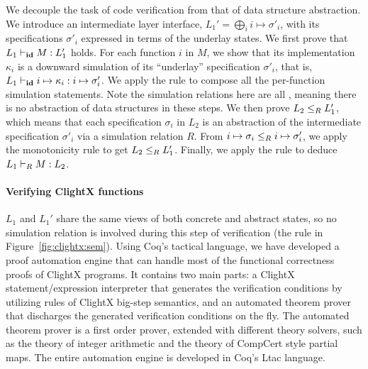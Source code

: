 We decouple the task of code verification from that of data structure
abstraction. We introduce an intermediate layer interface, $L_1'=\bigoplus_i i \mapsto \sigma'_i$, with its specifications
$\sigma'_i$ expressed in terms of the underlay states.
We first prove that $L_1 \vdash_{\textbf{id}} M : L_1'$ holds.  For each
function $i$ in $M$, we show that its implementation $\kappa_i$ is a
downward simulation of its ``underlay'' specification $\sigma'_i$,
that is, $L_1 \vdash_{\textbf{id}} i \mapsto \kappa_i : i \mapsto
  \sigma'_i$. We apply the  rule to compose all the
per-function simulation statements.  Note the simulation
relations here are all \id, meaning there is no abstraction of
data structures in these steps.
%
% 
We then prove $L_2 \le_{R} L_1'$, which means that each specification
$\sigma_i$ in $L_2$ is an abstraction of the intermediate specification
$\sigma'_i$ via a simulation relation $R$.  
From $i \mapsto \sigma_i \le_{R} i \mapsto \sigma'_i$,  
we apply the monotonicity rule  to 
get $L_2 \le_{R} L_1'$. Finally, we apply the  rule
to deduce $L_1 \vdash_{R} M : L_2$. 

\paragraph{Verifying ClightX functions}
$L_1$ and $L_1'$ share the same views of both concrete and abstract states,
so no simulation relation is involved during this step of verification
(\cf the  rule in Figure~\ref{fig:clightx:sem}).
Using Coq's tactical language,
we have developed a proof automation engine
that can handle most of the functional correctness proofs of
ClightX programs. It contains two main parts: a ClightX
statement/expression interpreter that generates the verification
conditions by utilizing rules of ClightX big-step semantics,
and an automated theorem prover that discharges
the generated verification conditions on the fly. 
The automated theorem prover is a first order prover,
extended with different theory solvers, such as the theory
of integer arithmetic and the theory of CompCert style partial maps.
The entire automation engine is developed in Coq's Ltac language.



